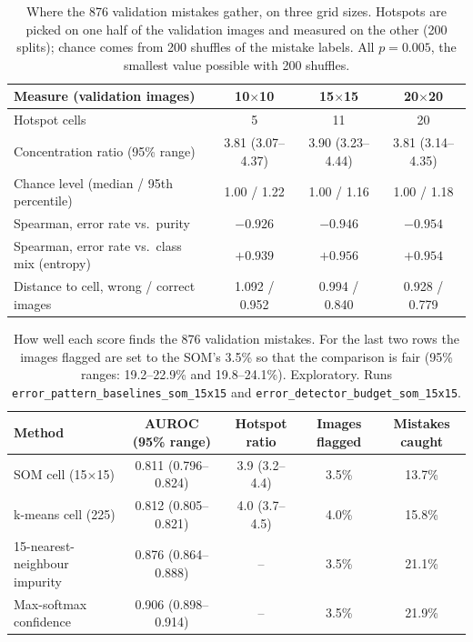 \documentclass[11pt]{article}
\begin{document}
\begin{table}[H]
\centering
\renewcommand{\arraystretch}{1.12}
\small
\begin{tabular}{|l|c|c|c|}
\hline
\textbf{Measure (validation images)} & \textbf{10$\times$10} & \textbf{15$\times$15} & \textbf{20$\times$20} \\ \hline
Hotspot cells & 5 & 11 & 20 \\ \hline
Concentration ratio (95\% range) & 3.81 (3.07--4.37) & 3.90 (3.23--4.44) & 3.81 (3.14--4.35) \\ \hline
Chance level (median / 95th percentile) & 1.00 / 1.22 & 1.00 / 1.16 & 1.00 / 1.18 \\ \hline
Spearman, error rate vs.\ purity & $-0.926$ & $-0.946$ & $-0.954$ \\ \hline
Spearman, error rate vs.\ class mix (entropy) & $+0.939$ & $+0.956$ & $+0.954$ \\ \hline
Distance to cell, wrong / correct images & 1.092 / 0.952 & 0.994 / 0.840 & 0.928 / 0.779 \\ \hline
\end{tabular}
\caption{Where the 876 validation mistakes gather, on three grid sizes. Hotspots are picked on one half of the validation images and measured on the other (200 splits); chance comes from 200 shuffles of the mistake labels. All $p=0.005$, the smallest value possible with 200 shuffles.}
\label{tab:robust}
\end{table}

\begin{table}[H]
\centering
\renewcommand{\arraystretch}{1.12}
\footnotesize\setlength{\tabcolsep}{3pt}
\begin{tabular}{|l|c|c|c|c|}
\hline
\textbf{Method} & \textbf{AUROC (95\% range)} & \textbf{Hotspot ratio} & \textbf{Images flagged} & \textbf{Mistakes caught} \\ \hline
SOM cell (15$\times$15) & 0.811 (0.796--0.824) & 3.9 (3.2--4.4) & 3.5\% & 13.7\% \\ \hline
k-means cell (225) & 0.812 (0.805--0.821) & 4.0 (3.7--4.5) & 4.0\% & 15.8\% \\ \hline
15-nearest-neighbour impurity & 0.876 (0.864--0.888) & -- & 3.5\% & 21.1\% \\ \hline
Max-softmax confidence & 0.906 (0.898--0.914) & -- & 3.5\% & 21.9\% \\ \hline
\end{tabular}
\caption{How well each score finds the 876 validation mistakes. For the last two rows the images flagged are set to the SOM's 3.5\% so that the comparison is fair (95\% ranges: 19.2--22.9\% and 19.8--24.1\%). Exploratory. Runs \texttt{error\_pattern\_baselines\_som\_15x15} and \texttt{error\_detector\_budget\_som\_15x15}.}
\label{tab:baselines}
\end{table}
\end{document}

